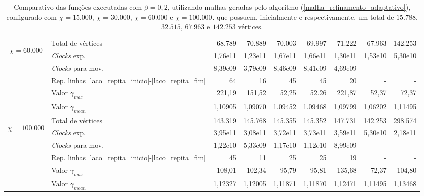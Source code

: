 \begin{table}
\begin{center}
\begin{tabular}{|c|l|r|r|r|r|r|r|r|}
\hline %
\multirow{5}{*}{\begin{sideways}$\chi = 60.000$\end{sideways} } 
& Total de vértices                                                     & 68.789 & 70.889 & 70.003 & 69.997 & 71.222 & 67.963 & 142.253 \\
& {\it Clocks} exp.	                                             	& 1,76e11 & 1,23e11 & 1,67e11 & 1,66e11 & 1,30e11 & 1,53e10 &  5,30e10 \\
& {\it Clocks} para mov.                                  		& 8,39e09 & 3,79e09 & 8,46e09 & 8,41e09 & 4,69e09 & - & - \\
& Rep. linhas \ref{laco_repita_inicio}-\ref{laco_repita_fim} 		& 64 & 16 & 45 & 45 & 20 & - & - \\
& Valor $\gamma_{max}$							& 221,19 & 151,52 & 52,25 & 52.26 & 221,87 & 52,37 & 72,37 \\
& Valor $\gamma_{mean}$							& 1,10905 & 1,09070 & 1.09452 & 1.09468 & 1,09799 & 1,06202 & 1,11495 \\
\hline %
\multirow{5}{*}{\begin{sideways}$\chi = 100.000$\end{sideways} } 
& Total de vértices                                                     & 143.319 & 145.768 & 145.355 & 145.352 & 147.731 & 142.253 & 298.574 \\
& {\it Clocks} exp.	                                             	& 3,95e11 & 3,08e11 & 3,72e11 & 3,73e11 & 3,59e11 & 5,30e10 & 2,18e11 \\
& {\it Clocks} para mov.                                      		& 1,22e10 & 5,33e09 & 1,17e10 & 1,12e10 & 8,99e09 & - & - \\
& Rep. linhas \ref{laco_repita_inicio}-\ref{laco_repita_fim} 		& 45 & 11 & 25 & 25 & 19 & - & - \\
& Valor $\gamma_{max}$							& 108,01 & 102,34 & 95,79 & 95,81 & 135,68 & 72,37 & 104,80 \\
& Valor $\gamma_{mean}$							& 1,12327 & 1,12005 & 1,11871 & 1,11870 & 1,12471 & 1,11495 & 1,13468 \\
\hline %
\end{tabular}%
\end{center}
\caption{Comparativo das funções executadas com $\beta = 0,2$, utilizando malhas geradas pelo algoritmo (\ref{malha_refinamento_adaptativo}), configurado com $\chi = 15.000$, $\chi = 30.000$, $\chi = 60.000$ e $\chi = 100.000$. que possuem, inicialmente e respectivamente, um total de $15.788$, $32.515$, $67.963$ e $142.253$ vértices.} %
\label{tabelaComparativo_beta_2}
\end{table}



